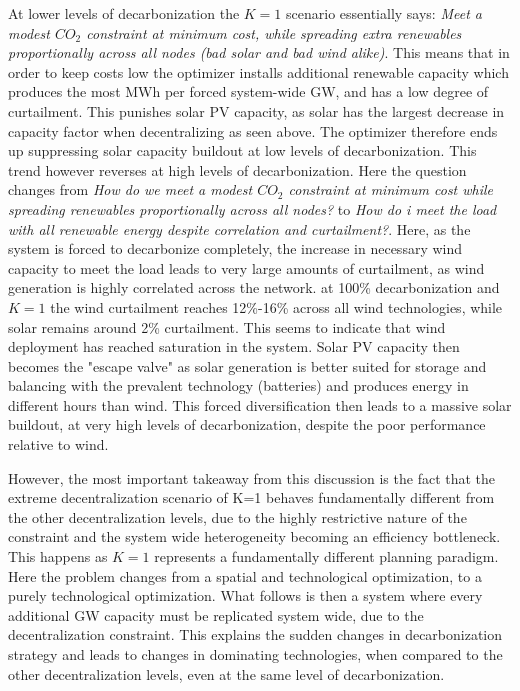 \documentclass[preprint,12pt,nopreprintline]{elsarticle}
\begin{document}
\medskip
\noindent
At lower levels of decarbonization the $K=1$ scenario essentially says: \textit{ Meet a modest $CO_2$ constraint at minimum cost, while spreading extra renewables proportionally across all nodes (bad solar and bad wind alike)}. This means that in order to keep costs low the optimizer installs additional renewable capacity which produces the most MWh per forced system-wide GW, and has a low degree of curtailment. This punishes solar PV capacity, as solar has the largest decrease in capacity factor when decentralizing as seen above. The optimizer therefore ends up suppressing solar capacity buildout at low levels of decarbonization. This trend however reverses at high levels of decarbonization. Here the question changes from \textit{ How do we meet a modest $CO_2$ constraint at minimum cost while spreading renewables proportionally across all nodes?} to \textit{How do i meet the load with all renewable energy despite correlation and curtailment?}. Here, as the system is forced to decarbonize completely, the increase in necessary wind capacity to meet the load leads to very large amounts of curtailment, as wind generation is highly correlated across the network. at 100\% decarbonization and $K=1$ the wind curtailment reaches 12\%-16\% across all wind technologies, while solar remains around 2\% curtailment. This seems to indicate that wind deployment has reached saturation in the system. Solar PV capacity then becomes the "escape valve" as solar generation is better suited for storage and balancing with the prevalent technology (batteries) and produces energy in different hours than wind. This forced diversification then leads to a massive solar buildout, at very high levels of decarbonization, despite the poor performance relative to wind.

\medskip
\noindent
However, the most important takeaway from this discussion is the fact that the extreme decentralization scenario of K=1 behaves fundamentally different from the other decentralization levels, due to the highly restrictive nature of the constraint and the system wide heterogeneity becoming an efficiency bottleneck. This happens as $K=1$ represents a fundamentally different planning paradigm. Here the problem changes from a spatial and technological optimization, to a purely technological optimization. What follows is then a system where every additional GW capacity must be replicated system wide, due to the decentralization constraint. This explains the sudden changes in decarbonization strategy and leads to changes in dominating technologies, when compared to the other decentralization levels, even at the same level of decarbonization.
\end{document}
